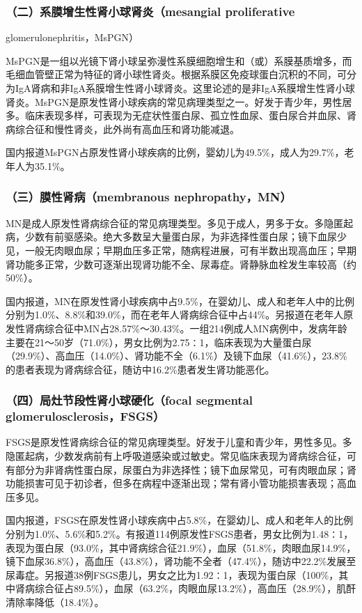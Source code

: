 \subsubsection{（二）系膜增生性肾小球肾炎（mesangial proliferative}
glomerulonephritis，MsPGN）

MsPGN是一组以光镜下肾小球呈弥漫性系膜细胞增生和（或）系膜基质增多，而毛细血管壁正常为特征的肾小球性肾炎。根据系膜区免疫球蛋白沉积的不同，可分为IgA肾病和非IgA系膜增生性肾小球肾炎。这里论述的是非IgA系膜增生性肾小球肾炎。MsPGN是原发性肾小球疾病的常见病理类型之一。好发于青少年，男性居多。临床表现多样，可表现为无症状性蛋白尿、孤立性血尿、蛋白尿合并血尿、肾病综合征和慢性肾炎，此外尚有高血压和肾功能减退。

国内报道MsPGN占原发性肾小球疾病的比例，婴幼儿为49.5\%，成人为29.7\%，老年人为35.1\%。

\subsubsection{（三）膜性肾病（membranous nephropathy，MN）}

MN是成人原发性肾病综合征的常见病理类型。多见于成人，男多于女。多隐匿起病，少数有前驱感染。绝大多数呈大量蛋白尿，为非选择性蛋白尿；镜下血尿少见，一般无肉眼血尿；早期血压多正常，随病程进展，可有半数出现高血压；早期肾功能多正常，少数可逐渐出现肾功能不全、尿毒症。肾静脉血栓发生率较高（约50\%）。

国内报道，MN在原发性肾小球疾病中占9.5\%，在婴幼儿、成人和老年人中的比例分别为1.0\%、8.8\%和39.0\%，而在老年人肾病综合征中占44\%。另报道在老年人原发性肾病综合征中MN占28.57\%～30.43\%。一组214例成人MN病例中，发病年龄主要在21～50岁（71.0\%），男女比例为2.75∶1，临床表现为大量蛋白尿（29.9\%）、高血压（14.0\%）、肾功能不全（6.1\%）及镜下血尿（41.6\%），23.8\%的患者表现为肾病综合征，随访中16.2\%患者发生肾功能恶化。

\subsubsection{（四）局灶节段性肾小球硬化（focal segmental glomerulosclerosis，FSGS）}

FSGS是原发性肾病综合征的常见病理类型。好发于儿童和青少年，男性多见。多隐匿起病，少数发病前有上呼吸道感染或过敏史。常见临床表现为肾病综合征，可有部分为非肾病性蛋白尿，尿蛋白为非选择性；镜下血尿常见，可有肉眼血尿；肾功能损害可见于初诊者，但多在病程中逐渐出现；常有肾小管功能损害表现；高血压多见。

国内报道，FSGS在原发性肾小球疾病中占5.8\%，在婴幼儿、成人和老年人的比例分别为1.0\%、5.6\%和5.2\%。有报道114例原发性FSGS患者，男女比例为1.48∶1，表现为蛋白尿（93.0\%，其中肾病综合征21.9\%），血尿（51.8\%，肉眼血尿14.9\%，镜下血尿36.8\%），高血压（43.8\%），肾功能不全者（47.4\%），随访中22.2\%发展至尿毒症。另报道38例FSGS患儿，男女之比为1.92∶1，表现为蛋白尿（100\%，其中肾病综合征占89.5\%），血尿（63.2\%，肉眼血尿13.2\%），高血压（28.9\%），肌酐清除率降低（18.4\%）。

